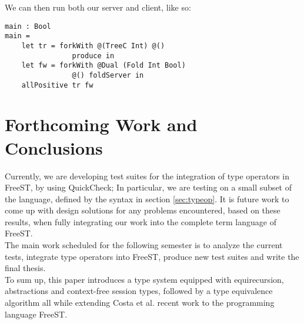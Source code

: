 \documentclass[sigplan]{acmart}
\begin{document}
We can then run both our server and client, like so:
\begin{lstlisting}
main : Bool
main = 
    let tr = forkWith @(TreeC Int) @() 
                produce in
    let fw = forkWith @Dual (Fold Int Bool)
                @() foldServer in
    allPositive tr fw
\end{lstlisting}
\vspace{3mm}

\section{Forthcoming Work and Conclusions} \label{sec:conclusions}

Currently, we are developing test suites for the integration of type operators in FreeST, by using QuickCheck; In particular, we are testing on a small subset of the language, defined by the syntax in section \ref{sec:typeop}. 
It is future work to come up with design solutions for any problems encountered, based on these results, when fully integrating our work into the complete term language of FreeST.\\
The main work scheduled for the following semester is to analyze the current tests, integrate type operators into FreeST, produce new test suites and write the final thesis.\\

To sum up, this paper introduces a type system equipped with equirecursion, abstractions and context-free session types, followed by a type equivalence algorithm all while extending Costa et al. \cite{PocasCMV23} recent work to the programming language FreeST.



\end{document}
